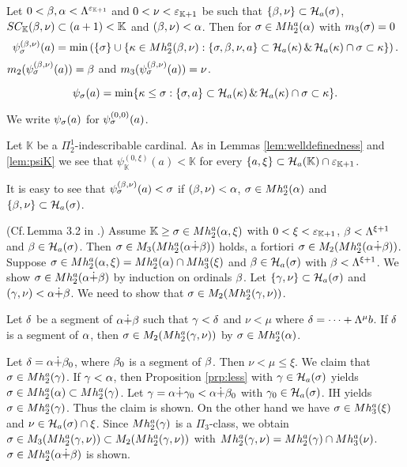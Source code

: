 \documentclass{article}
\newcommand{\mK}{\mathbb{K}}
\begin{document}
{\item
Let $0<\bet,\alp<\Lam^{\veps_{\mK+1}}$ and $0< \nu<\veps_{\mK+1}$ be such that
$\{\beta,\nu\}\subset{\cal H}_{a}(\sigma)$, $SC_{\mK}(\bet,\nu)\subset (a+1)<\mK$ and
$(\beta,\nu)<\alpha$.
Then for
$\sigma\in Mh_{2}^{a}(\alpha)$ with $m_{3}(\sigma)=0$
\[
\psi_{\sigma}^{(\beta,\nu)}(a)=\min\left(\{\sigma\}\cup
\{\kappa\in Mh_{2}^{a}(\beta,\nu): \{\sigma,\beta,\nu,a\}\subset{\cal H}_{a}(\kappa) \,\&\,
{\cal H}_{a}(\kappa)\cap\sigma\subset\kappa\}
\right).
\]
$m_{2}(\psi_{\sigma}^{(\beta,\nu)}(a))=\beta$ and $m_{3}(\psi_{\sigma}^{(\beta,\nu)}(a))=\nu$.

\item
\[
\psi_{\sigma}(a)=\min
\{\kappa\leq\sigma : \{\sigma,a\}\subset{\cal H}_{a}(\kappa) \,\&\,
{\cal H}_{a}(\kappa)\cap\sigma\subset\kappa\}
.
\]

 \eenu

We write $\psi_{\sigma}(a)$ for $\psi_{\sigma}^{(0,0)}(a)$.
\eenu
}
\edf

Let $\mK$ be a $\Pi^{1}_{2}$-indescribable cardinal. As in Lemmas \ref{lem:welldefinedness} and \ref{lem:psiK} we see that
$\psi_{\mK}^{(0,\xi)}(a)<\mK$ for every $\{a,\xi\}\subset\calh_{a}(\mK)\cap\veps_{\mK+1}$.

It is easy to see that $\psi_{\sigma}^{(\beta,\nu)}(a)<\sigma$
if $(\beta,\nu)<\alpha$, $\sigma\in Mh_{2}^{a}(\alpha)$ and
$\{\beta,\nu\}\subset{\cal H}_{a}(\sigma)$.



\blem\label{lem:stepdown}{\rm (Cf.\,Lemma 3.2 in \cite{LMPS}.)}
Assume $\mK\geq\sig\in Mh^{a}_{2}(\alp,\xi)$ with
$0<\xi<\veps_{\mK+1}$,
$\beta<\Lambda^{\xi+1}$ and
$\beta\in{\cal H}_{a}(\sigma)$.
Then
$\sigma\in M_{3}(Mh^{a}_{2}(\alpha\dot{+}\beta))$ holds, a fortiori $\sigma\in M_{2}(Mh^{a}_{2}(\alpha\dot{+}\beta))$.
\elem
\bprf
Suppose $\sigma\in Mh^{a}_{2}(\alpha,\xi)=Mh^{a}_{2}(\alpha)\cap Mh^{a}_{3}(\xi)$ and $\beta\in{\cal H}_{a}(\sigma)$ with $\beta<\Lambda^{\xi+1}$.
We show $\sigma\in Mh^{a}_{2}(\alpha\dot{+}\beta)$ 
by induction on ordinals $\beta$.
Let $\{\gamma,\nu\}\subset{\cal H}_{a}(\sigma)$ and
$(\gamma,\nu)<\alpha\dot{+}\beta$.
We need to show that $\sigma\in M_{2}(Mh^{a}_{2}(\gamma,\nu))$.

Let $\delta$ be a segment of $\alpha\dot{+}\beta$ such that
$\gamma<\delta$ and $\nu<\mu$ where
$\delta=\cdots+\Lambda^{\mu}b$.
If $\delta$ is a segment of $\alpha$, then $\sigma\in M_{2}(Mh^{a}_{2}(\gamma,\nu))$
by $\sigma\in Mh^{a}_{2}(\alpha)$.

Let
$\delta=\alpha\dot{+}\beta_{0}$, where $\beta_{0}$ is a segment of $\beta$.
Then $\nu<\mu\leq\xi$.
We claim that $\sigma\in Mh_{2}^{a}(\gamma)$.
If $\gamma<\alpha$, then Proposition \ref{prp:less} with $\gamma\in{\cal H}_{a}(\sigma)$
yields $\sigma\in Mh^{a}_{2}(\alpha)\subset Mh^{a}_{2}(\gamma)$.
Let $\gamma=\alpha\dot{+}\gamma_{0}<\alpha\dot{+}\beta_{0}$ with $\gamma_{0}\in{\cal H}_{a}(\sigma)$.
IH yields $\sigma\in Mh_{2}^{a}(\gamma)$.
Thus the claim is shown.
On the other hand we have $\sigma\in Mh_{3}^{a}(\xi)$ and $\nu\in{\cal H}_{a}(\sigma)\cap\xi$.
Since $Mh_{2}^{a}(\gamma)$ is a $\Pi_{3}$-class, we obtain
$\sigma\in M_{3}(Mh_{2}^{a}(\gamma,\nu))\subset M_{2}(Mh_{2}^{a}(\gamma,\nu))$ 
with $Mh_{2}^{a}(\gamma,\nu)=Mh_{2}^{a}(\gamma)\cap Mh_{3}^{a}(\nu)$.
$\sigma\in Mh^{a}_{2}(\alpha\dot{+}\beta)$ is shown.
\end{document}
